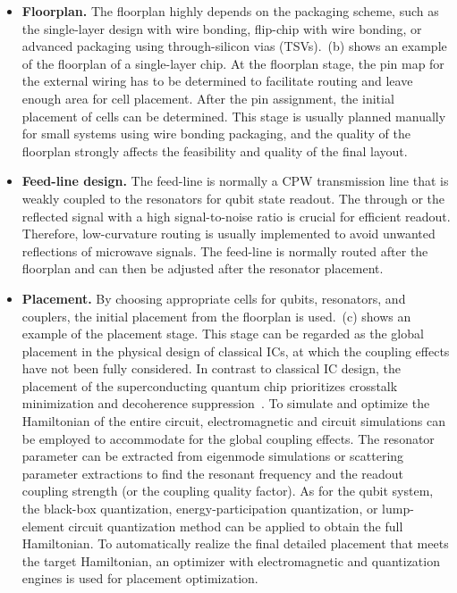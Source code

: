 \documentclass[a4paper,onecolumn,11pt,unpublished]{quantumarticle}
\begin{document}
\begin{itemize}
\begin{itemize}
    \end{itemize}
    \item \textbf{Floorplan.} The floorplan highly depends on the packaging scheme, such as the single-layer design with wire bonding, flip-chip with wire bonding, or advanced packaging using through-silicon vias (TSVs).~(b) shows an example of the floorplan of a single-layer chip. At the floorplan stage, the pin map for the external wiring has to be determined to facilitate routing and leave enough area for cell placement. After the pin assignment, the initial placement of cells can be determined. This stage is usually planned manually for small systems using wire bonding packaging, and the quality of the floorplan strongly affects the feasibility and quality of the final layout. 
    \item \textbf{Feed-line design.} The feed-line is normally a CPW transmission line that is weakly coupled to the resonators for qubit state readout. The through or the reflected signal with a high signal-to-noise ratio is crucial for efficient readout. Therefore, low-curvature routing is usually implemented to avoid unwanted reflections of microwave signals. The feed-line is normally routed after the floorplan and can then be adjusted after the resonator placement. 
    \item \textbf{Placement.} By choosing appropriate cells for qubits, resonators, and couplers, the initial placement from the floorplan is used.~(c) shows an example of the placement stage. This stage can be regarded as the global placement in the physical design of classical ICs, at which the coupling effects have not been fully considered.
    In contrast to classical IC design, the placement of the superconducting quantum chip prioritizes crosstalk minimization and decoherence suppression~\cite{Zhang2025_QPlacer, Zhang2025_QGDP}. 
    To simulate and optimize the Hamiltonian of the entire circuit, electromagnetic and circuit simulations can be employed to accommodate for the global coupling effects. The resonator parameter can be extracted from eigenmode simulations or scattering parameter extractions to find the resonant frequency and the readout coupling strength (or the coupling quality factor). As for the qubit system, the black-box quantization, energy-participation quantization, or lump-element circuit quantization method can be applied to obtain the full Hamiltonian. To automatically realize the final detailed placement that meets the target Hamiltonian, an optimizer with electromagnetic and quantization engines is used for placement optimization. 

\end{itemize}
\end{document}
